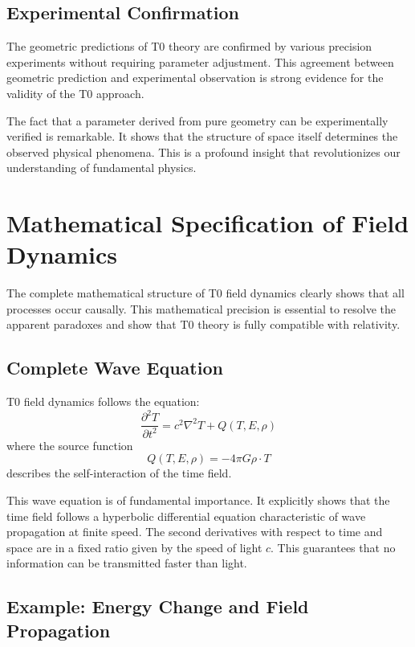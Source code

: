 \documentclass[12pt,a4paper]{article}
\begin{document}
	\subsection{Experimental Confirmation}
	
	The geometric predictions of T0 theory are confirmed by various precision experiments without requiring parameter adjustment. This agreement between geometric prediction and experimental observation is strong evidence for the validity of the T0 approach.
	
	The fact that a parameter derived from pure geometry can be experimentally verified is remarkable. It shows that the structure of space itself determines the observed physical phenomena. This is a profound insight that revolutionizes our understanding of fundamental physics.
	
	\section{Mathematical Specification of Field Dynamics}
	
	The complete mathematical structure of T0 field dynamics clearly shows that all processes occur causally. This mathematical precision is essential to resolve the apparent paradoxes and show that T0 theory is fully compatible with relativity.
	
	\subsection{Complete Wave Equation}
	
	T0 field dynamics follows the equation:
	\begin{equation}
		\frac{\partial^2 T}{\partial t^2} = c^2\nabla^2 T + Q(T, E, \rho) \label{eq:wave_equation}
	\end{equation}
	where the source function
	\begin{equation}
		Q(T, E, \rho) = -4\pi G \rho \cdot T
	\end{equation}
	describes the self-interaction of the time field.
	
	This wave equation is of fundamental importance. It explicitly shows that the time field follows a hyperbolic differential equation characteristic of wave propagation at finite speed. The second derivatives with respect to time and space are in a fixed ratio given by the speed of light $c$. This guarantees that no information can be transmitted faster than light.
	
	\subsection{Example: Energy Change and Field Propagation}
	
\end{document}
